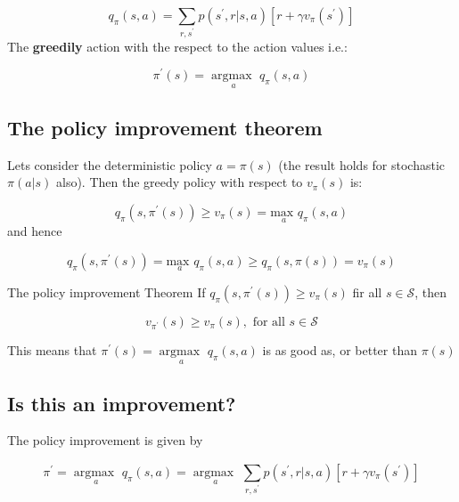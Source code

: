 	\begin{equation}
		q_\pi(s,a) = \sum_{r, s^{\prime}}^{} p(s^{\prime},r|s,a)[r + \gamma v_\pi(s^{\prime})]
	\end{equation}
The \textbf{greedily} action with the respect to the action values i.e.:

	\begin{equation}
		\pi^{\prime} (s) = \underset{a}{\arg \text{max }} q_\pi(s,a)
	\end{equation}
	
\subsection*{The policy improvement theorem}
Lets consider the deterministic policy $a = \pi(s)$ (the result holds for stochastic $\pi (a|s)$ also). Then the greedy policy with respect to $v_\pi(s)$ is:

	\begin{equation}
		q_\pi(s, \pi^{\prime} (s)) \ge v_\pi(s) = \underset{a}{\text{max }} q_\pi(s,a)
	\end{equation}
and hence

	\begin{equation}
		q_\pi(s, \pi^{\prime}(s)) = \underset{a}{\text{max }}q_\pi(s,a) \ge q_\pi(s,\pi(s)) = v_\pi(s)
	\end{equation}

\begin{wbox}{The policy improvement Theorem}
If $q_\pi(s,\pi^{\prime}(s)) \ge v_\pi(s)$ fir all $s \in \mathcal{S}$, then

	\begin{equation}
		v_{\pi^{\prime}}(s) \ge v_\pi(s), \text{ for all } s \in \mathcal{S}
	\end{equation} 
\end{wbox}


This means that $\pi^{\prime}(s) = \underset{a}{\arg \text{max }} q_\pi(s,a)$ is as good as, or better than $\pi(s)$


\subsection*{Is this an improvement?}
The policy improvement is given by

	\begin{equation}
		\pi^{\prime} = \underset{a}{\arg \text{max }} q_\pi(s,a) = \underset{a}{\arg \text{max }}\sum_{r, s^{\prime}}^{} p(s^{\prime},r|s,a)[r + \gamma v_\pi(s^{\prime})]
	\end{equation}


